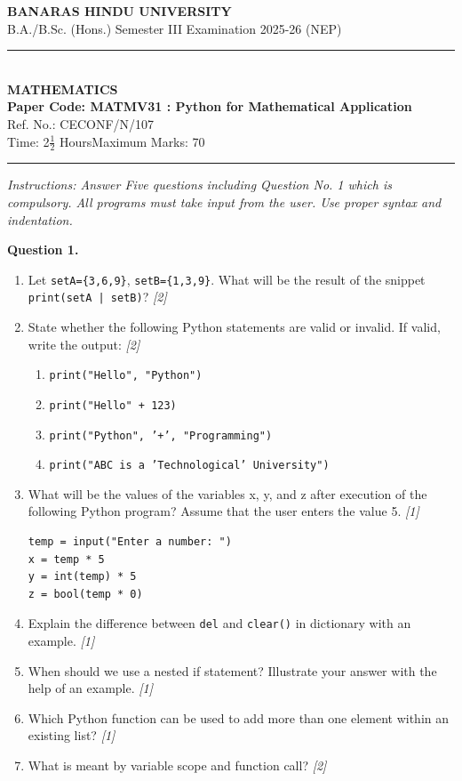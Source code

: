 \documentclass[11pt,a4paper]{article}
\newcommand{\pts}[1]{\hfill \textit{[#1]}}
\begin{document}
\begin{center}
  {\large\bfseries BANARAS HINDU UNIVERSITY}\\[2pt]
  {\normalsize B.A./B.Sc. (Hons.) Semester III Examination 2025-26 (NEP)}\\[6pt]
  \rule{0.8\linewidth}{0.5pt}\\[6pt]
  {\large\bfseries MATHEMATICS}\\[4pt]
  {\large\bfseries Paper Code: MATMV31 : Python for Mathematical Application}\\[2pt]
  {\small Ref. No.: CECONF/N/107}\\[4pt]
  {\normalsize Time: 2$\frac{1}{2}$ Hours\hfill Maximum Marks: 70}
\end{center}

\rule{\linewidth}{0.4pt}

\smallskip

\noindent \textit{Instructions: Answer Five questions including Question No. 1 which is compulsory. All programs must take input from the user. Use proper syntax and indentation.}

\bigskip

\noindent \textbf{Question 1.}
\begin{enumerate}[label=(\alph*)]
  \item Let \texttt{setA=\{3,6,9\}}, \texttt{setB=\{1,3,9\}}. What will be the result of the snippet \texttt{print(setA | setB)}? \pts{2}
  \item State whether the following Python statements are valid or invalid. If valid, write the output: \pts{2}
  \begin{enumerate}[label=\Roman*.]
    \item \texttt{print("Hello", "Python")}
    \item \texttt{print("Hello" + 123)}
    \item \texttt{print("Python", '+', "Programming")}
    \item \texttt{print("ABC is a 'Technological' University")}
  \end{enumerate}
  \item What will be the values of the variables x, y, and z after execution of the following Python program? Assume that the user enters the value 5. \pts{1}
\begin{lstlisting}
temp = input("Enter a number: ")
x = temp * 5
y = int(temp) * 5
z = bool(temp * 0)
\end{lstlisting}
  \item Explain the difference between \texttt{del} and \texttt{clear()} in dictionary with an example. \pts{1}
  \item When should we use a nested if statement? Illustrate your answer with the help of an example. \pts{1}
  \item Which Python function can be used to add more than one element within an existing list? \pts{1}
  \item What is meant by variable scope and function call? \pts{2}
\end{enumerate}
\end{document}
